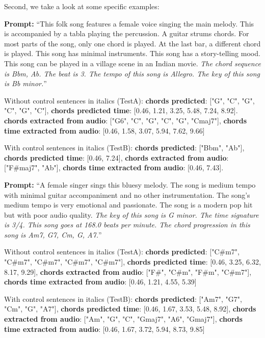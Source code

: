 \documentclass[11pt]{article}
\begin{document}
Second, we take a look at some specific examples:


\begin{mdframed}[backgroundcolor=blue!10] 
\textbf{Prompt:} ``This folk song features a female voice singing the main melody. This is accompanied by a tabla playing the percussion. A guitar strums chords. For most parts of the song, only one chord is played. At the last bar, a different chord is played. This song has minimal instruments. This song has a story-telling mood. This song can be played in a village scene in an Indian movie. \textit{The chord sequence is Bbm, Ab. The beat is 3. The tempo of this song is Allegro. The key of this song is Bb minor.}''

Without control sentences in italics (TestA):
\textbf{chords predicted}: ["G", "C", "G", "C", "G", "C"], \textbf{chords predicted time}: [0.46, 1.21, 3.25, 5.48, 7.24, 8.92].
\textbf{chords extracted from audio}: ["G6", "C", "G", "C", "G", "Cmaj7"], \textbf{chords time extracted from audio}: [0.46, 1.58, 3.07, 5.94, 7.62, 9.66]

With control sentences in italics (TestB):
\textbf{chords predicted}: ["Bbm", "Ab"], \textbf{chords predicted time}: [0.46, 7.24],
\textbf{chords extracted from audio}: ["F\#maj7", "Ab"], \textbf{chords time extracted from audio}: [0.46, 7.43].

\end{mdframed}

\begin{mdframed}[backgroundcolor=blue!10] 
\textbf{Prompt:} ``A female singer sings this bluesy melody. The song is medium tempo with minimal guitar accompaniment and no other instrumentation. The song's medium tempo is very emotional and passionate. The song is a modern pop hit but with poor audio quality. \textit{The key of this song is G minor. The time signature is 3/4. This song goes at 168.0 beats per minute. The chord progression in this song is Am7, G7, Cm, G, A7.}''

Without control sentences in italics (TestA):
\textbf{chords predicted}: ["C\#m7", "C\#m7", "C\#m7", "C\#m7", "C\#m7"], \textbf{chords predicted time}: [0.46, 3.25, 6.32, 8.17, 9.29],
\textbf{chords extracted from audio}: ["F\#", "C\#m", "F\#m", "C\#m7"], \textbf{chords time extracted from audio}: [0.46, 1.21, 4.55, 5.39]

With control sentences in italics (TestB):
\textbf{chords predicted}: ["Am7", "G7", "Cm", "G", "A7"], \textbf{chords predicted time}: [0.46, 1.67, 3.53, 5.48, 8.92],
\textbf{chords extracted from audio}: ["Am", "G", "C", "Gmaj7", "A6", "Gmaj7"], \textbf{chords time extracted from audio}: [0.46, 1.67, 3.72, 5.94, 8.73, 9.85]
\end{mdframed}
\end{document}
